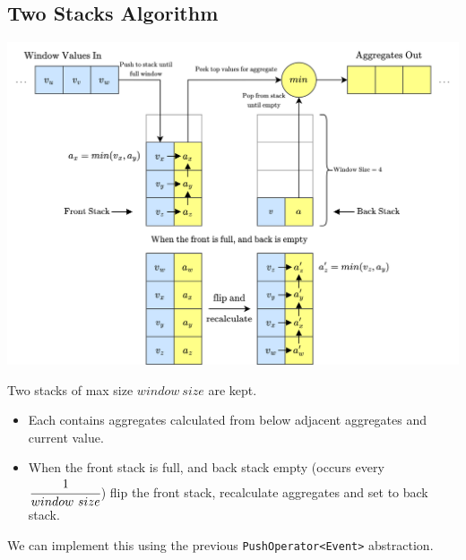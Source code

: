 \subsection{Two Stacks Algorithm}
\begin{center}
    \includegraphics[width=.9\textwidth]{streams/images/two_stacks.drawio.png}
\end{center}
Two stacks of max size $window \ size$ are kept.
\begin{itemize}
    \item Each contains aggregates calculated from below adjacent aggregates and current value.
    \item When the front stack is full, and back stack empty (occurs every $\cfrac{1}{window \ size}$) flip the front stack, recalculate aggregates and set to back stack.
\end{itemize}
We can implement this using the previous \texttt{PushOperator<Event>} abstraction.
